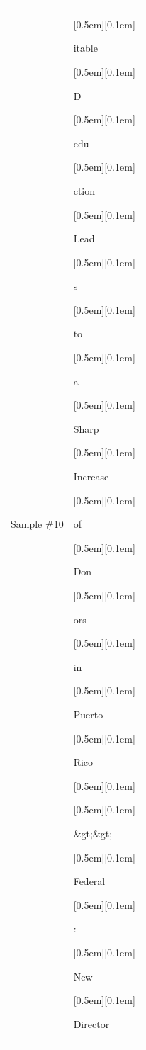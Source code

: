 \begin{table}[ht]
\begin{tabular}{@{}l p{13cm}@{}}
\vspace{10pt}
Sample \#10 &
{\setlength{\fboxsep}{1pt}\raisebox{0pt}[0.5em][0.1em]{\colorbox{Salmon!60}{\strut{itable}}}}{\setlength{\fboxsep}{1pt}\raisebox{0pt}[0.5em][0.1em]{\colorbox{DarkOrchid!25}{\strut{ D}}}}{\setlength{\fboxsep}{1pt}\raisebox{0pt}[0.5em][0.1em]{\colorbox{DarkOrchid!25}{\strut{edu}}}}{\setlength{\fboxsep}{1pt}\raisebox{0pt}[0.5em][0.1em]{\colorbox{DarkOrchid!25}{\strut{ction}}}}{\setlength{\fboxsep}{1pt}\raisebox{0pt}[0.5em][0.1em]{\colorbox{DarkOrchid!25}{\strut{ Lead}}}}{\setlength{\fboxsep}{1pt}\raisebox{0pt}[0.5em][0.1em]{\colorbox{DarkOrchid!25}{\strut{s}}}}{\setlength{\fboxsep}{1pt}\raisebox{0pt}[0.5em][0.1em]{\colorbox{DarkOrchid!25}{\strut{ to}}}}{\setlength{\fboxsep}{1pt}\raisebox{0pt}[0.5em][0.1em]{\colorbox{DarkOrchid!25}{\strut{ a}}}}{\setlength{\fboxsep}{1pt}\raisebox{0pt}[0.5em][0.1em]{\colorbox{Salmon!60}{\strut{ Sharp}}}}{\setlength{\fboxsep}{1pt}\raisebox{0pt}[0.5em][0.1em]{\colorbox{DarkOrchid!25}{\strut{ Increase}}}}{\setlength{\fboxsep}{1pt}\raisebox{0pt}[0.5em][0.1em]{\colorbox{Salmon!60}{\strut{ of}}}}{\setlength{\fboxsep}{1pt}\raisebox{0pt}[0.5em][0.1em]{\colorbox{DarkOrchid!25}{\strut{ Don}}}}{\setlength{\fboxsep}{1pt}\raisebox{0pt}[0.5em][0.1em]{\colorbox{Salmon!60}{\strut{ors}}}}{\setlength{\fboxsep}{1pt}\raisebox{0pt}[0.5em][0.1em]{\colorbox{SkyBlue!55}{\strut{ in}}}}{\setlength{\fboxsep}{1pt}\raisebox{0pt}[0.5em][0.1em]{\colorbox{DarkOrchid!25}{\strut{ Puerto}}}}{\setlength{\fboxsep}{1pt}\raisebox{0pt}[0.5em][0.1em]{\colorbox{DarkOrchid!25}{\strut{ Rico}}}}{\setlength{\fboxsep}{1pt}\raisebox{0pt}[0.5em][0.1em]{\colorbox{DarkOrchid!25}{\strut{ }}}}{\setlength{\fboxsep}{1pt}\raisebox{0pt}[0.5em][0.1em]{\colorbox{DarkOrchid!25}{\strut{\&gt;\&gt;}}}}{\setlength{\fboxsep}{1pt}\raisebox{0pt}[0.5em][0.1em]{\colorbox{SkyBlue!55}{\strut{ Federal}}}}{\setlength{\fboxsep}{1pt}\raisebox{0pt}[0.5em][0.1em]{\colorbox{SkyBlue!55}{\strut{:}}}}{\setlength{\fboxsep}{1pt}\raisebox{0pt}[0.5em][0.1em]{\colorbox{SkyBlue!55}{\strut{ New}}}}{\setlength{\fboxsep}{1pt}\raisebox{0pt}[0.5em][0.1em]{\colorbox{Salmon!60}{\strut{ Director}}}}


\end{tabular}
\end{table}

